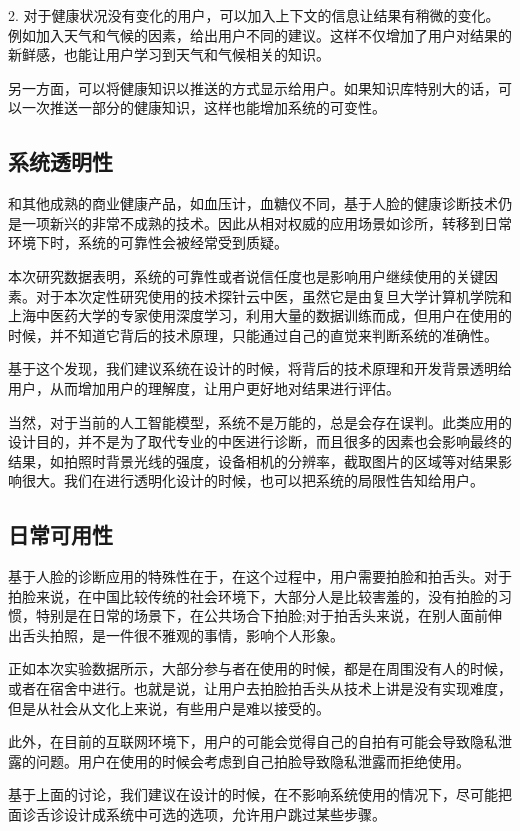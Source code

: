2. 对于健康状况没有变化的用户，可以加入上下文的信息让结果有稍微的变化。例如加入天气和气候的因素，给出用户不同的建议。这样不仅增加了用户对结果的新鲜感，也能让用户学习到天气和气候相关的知识。

另一方面，可以将健康知识以推送的方式显示给用户。如果知识库特别大的话，可以一次推送一部分的健康知识，这样也能增加系统的可变性。

\subsection{系统透明性}

和其他成熟的商业健康产品，如血压计，血糖仪不同，基于人脸的健康诊断技术仍是一项新兴的非常不成熟的技术。因此从相对权威的应用场景如诊所，转移到日常环境下时，系统的可靠性会被经常受到质疑。

本次研究数据表明，系统的可靠性或者说信任度也是影响用户继续使用的关键因素。对于本次定性研究使用的技术探针云中医，虽然它是由复旦大学计算机学院和上海中医药大学的专家使用深度学习，利用大量的数据训练而成，但用户在使用的时候，并不知道它背后的技术原理，只能通过自己的直觉来判断系统的准确性。

基于这个发现，我们建议系统在设计的时候，将背后的技术原理和开发背景透明给用户，从而增加用户的理解度，让用户更好地对结果进行评估。

当然，对于当前的人工智能模型，系统不是万能的，总是会存在误判。此类应用的设计目的，并不是为了取代专业的中医进行诊断，而且很多的因素也会影响最终的结果，如拍照时背景光线的强度，设备相机的分辨率，截取图片的区域等对结果影响很大。我们在进行透明化设计的时候，也可以把系统的局限性告知给用户。

\subsection{日常可用性}
基于人脸的诊断应用的特殊性在于，在这个过程中，用户需要拍脸和拍舌头。对于拍脸来说，在中国比较传统的社会环境下，大部分人是比较害羞的，没有拍脸的习惯，特别是在日常的场景下，在公共场合下拍脸;对于拍舌头来说，在别人面前伸出舌头拍照，是一件很不雅观的事情，影响个人形象。

正如本次实验数据所示，大部分参与者在使用的时候，都是在周围没有人的时候，或者在宿舍中进行。也就是说，让用户去拍脸拍舌头从技术上讲是没有实现难度，但是从社会从文化上来说，有些用户是难以接受的。

此外，在目前的互联网环境下，用户的可能会觉得自己的自拍有可能会导致隐私泄露的问题。用户在使用的时候会考虑到自己拍脸导致隐私泄露而拒绝使用。

基于上面的讨论，我们建议在设计的时候，在不影响系统使用的情况下，尽可能把面诊舌诊设计成系统中可选的选项，允许用户跳过某些步骤。

